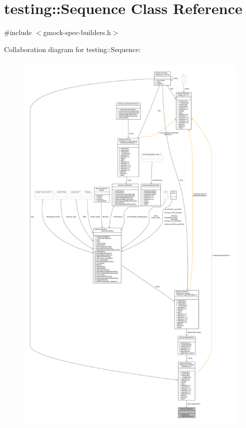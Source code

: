 \hypertarget{classtesting_1_1Sequence}{}\section{testing\+:\+:Sequence Class Reference}
\label{classtesting_1_1Sequence}


{\ttfamily \#include $<$gmock-\/spec-\/builders.\+h$>$}



Collaboration diagram for testing\+:\+:Sequence\+:
\nopagebreak
\begin{figure}[H]
\begin{center}
\leavevmode
\includegraphics[height=550pt]{classtesting_1_1Sequence__coll__graph}
\end{center}
\end{figure}
